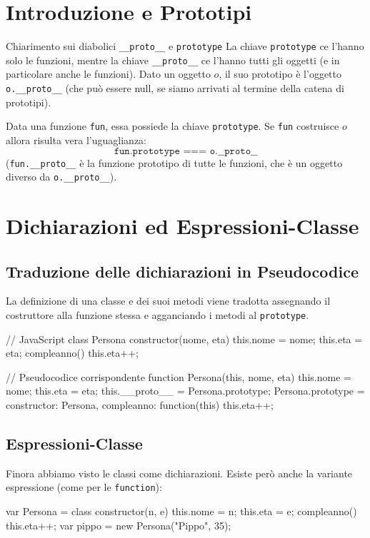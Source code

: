 \section{Introduzione e Prototipi}

\begin{definition}{Chiarimento sui diabolici \texttt{\_\_proto\_\_} e \texttt{prototype}}
La chiave \texttt{prototype} ce l'hanno solo le funzioni, mentre la chiave \texttt{\_\_proto\_\_} ce l'hanno tutti gli oggetti (e in particolare anche le funzioni). 
Dato un oggetto $o$, il suo prototipo è l'oggetto \texttt{o.\_\_proto\_\_} (che può essere null, se siamo arrivati al termine della catena di prototipi).
\end{definition}

Data una funzione \texttt{fun}, essa possiede la chiave \texttt{prototype}. Se \texttt{fun} costruisce $o$ allora risulta vera l'uguaglianza:
\begin{equation}
\texttt{fun.prototype === o.\_\_proto\_\_}
\end{equation}
(\texttt{fun.\_\_proto\_\_} è la funzione prototipo di tutte le funzioni, che è un oggetto diverso da \texttt{o.\_\_proto\_\_}).

\section{Dichiarazioni ed Espressioni-Classe}

\subsection{Traduzione delle dichiarazioni in Pseudocodice}
La definizione di una classe e dei suoi metodi viene tradotta assegnando il costruttore alla funzione stessa e agganciando i metodi al \texttt{prototype}.

\begin{jsbox}[title={Traduzione in Pseudocodice}]
// JavaScript
class Persona {
  constructor(nome, eta) {
    this.nome = nome;
    this.eta = eta;
  }
  compleanno() { this.eta++; }
}

// Pseudocodice corrispondente
function Persona(this, nome, eta) {
  this.nome = nome;
  this.eta = eta;
  this.__proto__ = Persona.prototype;
}
Persona.prototype = {
  constructor: Persona,
  compleanno: function(this) { this.eta++; }
}
\end{jsbox}

\subsection{Espressioni-Classe}
Finora abbiamo visto le classi come dichiarazioni. Esiste però anche la variante espressione (come per le \texttt{function}):
\begin{jsbox}[title={Espressione Classe}]
var Persona = class {
  constructor(n, e) {
    this.nome = n;
    this.eta = e;
  }
  compleanno() { this.eta++; }
}
var pippo = new Persona("Pippo", 35);
\end{jsbox}

